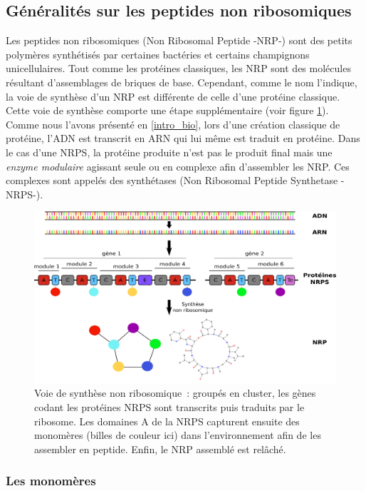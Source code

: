 \subsection{Généralités sur les peptides non ribosomiques}
Les peptides non ribosomiques (Non Ribosomal Peptide -NRP-) sont des petits polymères synthétisés par certaines bactéries et certains champignons unicellulaires.
Tout comme les protéines classiques, les NRP sont des molécules résultant d'assemblages de briques de base.
Cependant, comme le nom l'indique, la voie de synthèse d'un NRP est différente de celle d'une protéine classique.
Cette voie de synthèse comporte une étape supplémentaire (voir figure \ref{global}).
Comme nous l'avons présenté en \ref{intro_bio}, lors d'une création classique de protéine, l'ADN est transcrit en ARN qui lui même est traduit en protéine.
Dans le cas d'une NRPS, la protéine produite n'est pas le produit final mais une \textit{enzyme modulaire} agissant seule ou en complexe afin d'assembler les NRP.
Ces complexes sont appelés des synthétases (Non Ribosomal Peptide Synthetase -NRPS-).

\begin{figure}[h!]
  \begin{center}
    \includegraphics[width=450px]{Figures/bio/Intro/synthese.png}
    \caption{\label{global}Voie de synthèse non ribosomique~:
    groupés en cluster, les gènes codant les protéines NRPS sont transcrits puis traduits par le ribosome.
    Les domaines A de la NRPS capturent ensuite des monomères (billes de couleur ici) dans l'environnement afin de les assembler en peptide.
    Enfin, le NRP assemblé est relâché.
    }
  \end{center}
\end{figure}

\subsubsection{Les monomères}

